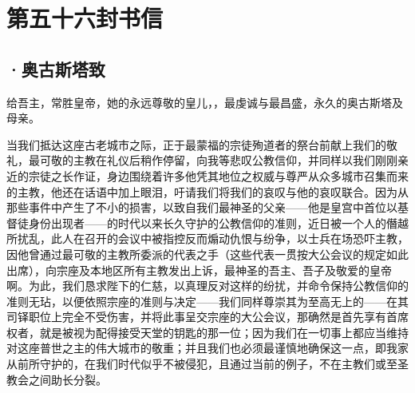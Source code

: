 

\section{第五十六封书信}


\subsection{·奥古斯塔致}

给吾主，常胜皇帝，她的永远尊敬的皇儿，，最虔诚与最昌盛，永久的奥古斯塔及母亲。\par

当我们抵达这座古老城市之际，正于最蒙福的宗徒殉道者的祭台前献上我们的敬礼，最可敬的主教在礼仪后稍作停留，向我等悲叹公教信仰，并同样以我们刚刚亲近的宗徒之长作证，身边围绕着许多他凭其地位之权威与尊严从众多城市召集而来的主教，他还在话语中加上眼泪，吁请我们将我们的哀叹与他的哀叹联合。因为从那些事件中产生了不小的损害，以致自我们最神圣的父亲——他是皇宫中首位以基督徒身份出现者——的时代以来长久守护的公教信仰的准则，近日被一个人的僭越所扰乱，此人在召开的会议中被指控反而煽动仇恨与纷争，以士兵在场恐吓主教，因他曾通过最可敬的主教所委派的代表之手（这些代表一贯按大公会议的规定如此出席），向宗座及本地区所有主教发出上诉，最神圣的吾主、吾子及敬爱的皇帝啊。为此，我们恳求陛下的仁慈，以真理反对这样的纷扰，并命令保持公教信仰的准则无玷，以便依照宗座的准则与决定——我们同样尊崇其为至高无上的——在其司铎职位上完全不受伤害，并将此事呈交宗座的大公会议，那确然是首先享有首席权者，就是被视为配得接受天堂的钥匙的那一位；因为我们在一切事上都应当维持对这座普世之主的伟大城市的敬重；并且我们也必须最谨慎地确保这一点，即我家从前所守护的，在我们时代似乎不被侵犯，且通过当前的例子，不在主教们或至圣教会之间助长分裂。\par


